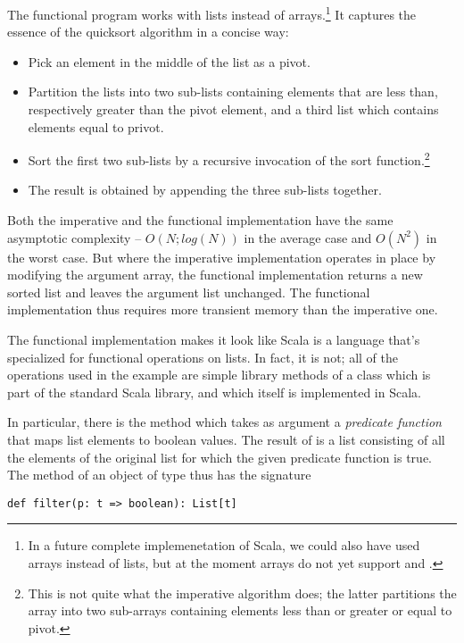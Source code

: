 \documentclass[a4paper,12pt,twoside,titlepage]{book}
\begin{document}
The functional program works with lists instead of arrays.\footnote{In
a future complete implemenetation of Scala, we could also have used arrays
instead of lists, but at the moment arrays do not yet support
 and \code{:::}.}
It captures the essence of the quicksort algorithm in a concise way:
\begin{itemize}
\item Pick an element in the middle of the list as a pivot.
\item Partition the lists into two sub-lists containing elements that
are less than, respectively greater than the pivot element, and a
third list which contains elements equal to privot.
\item Sort the first two sub-lists by a recursive invocation of
the sort function.\footnote{This is not quite what the imperative algorithm does;
the latter partitions the array into two sub-arrays containing elements
less than or greater or equal to pivot.}
\item The result is obtained by appending the three sub-lists together.
\end{itemize}
Both the imperative and the functional implementation have the same
asymptotic complexity -- $O(N;log(N))$ in the average case and
$O(N^2)$ in the worst case. But where the imperative implementation
operates in place by modifying the argument array, the functional
implementation returns a new sorted list and leaves the argument
list unchanged. The functional implementation thus requires more
transient memory than the imperative one.

The functional implementation makes it look like Scala is a language
that's specialized for functional operations on lists. In fact, it
is not; all of the operations used in the example are simple library
methods of a class  which is part of the standard
Scala library, and which itself is implemented in Scala.

In particular, there is the method  which takes as
argument a {\em predicate function} that maps list elements to
boolean values. The result of  is a list consisting of
all the elements of the original list for which the given predicate
function is true.  The  method of an object of type
 thus has the signature

\begin{lstlisting}
def filter(p: t => boolean): List[t]
\end{lstlisting}
\end{document}
